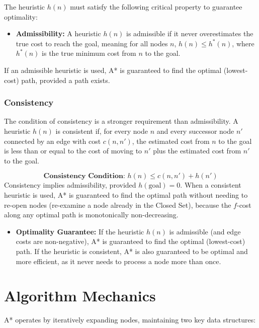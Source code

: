 The heuristic $h(n)$ must satisfy the following critical property to guarantee optimality:

\begin{itemize}
    \item \textbf{Admissibility:} A heuristic $h(n)$ is admissible if it never overestimates the true cost to reach the goal, meaning for all nodes $n$, $h(n) \le h^*(n)$, where $h^*(n)$ is the true minimum cost from $n$ to the goal.
\end{itemize}
If an admissible heuristic is used, A* is guaranteed to find the optimal (lowest-cost) path, provided a path exists.



\subsubsection{Consistency}
The condition of consistency is a stronger requirement than admissibility. A heuristic $h(n)$ is consistent if, for every node $n$ and every successor node $n'$ connected by an edge with cost $c(n, n')$, the estimated cost from $n$ to the goal is less than or equal to the cost of moving to $n'$ plus the estimated cost from $n'$ to the goal.

$$\textbf{Consistency Condition: } h(n) \le c(n, n') + h(n')$$
Consistency implies admissibility, provided $h(\text{goal}) = 0$. When a consistent heuristic is used, A* is guaranteed to find the optimal path without needing to re-open nodes (re-examine a node already in the Closed Set), because the $f$-cost along any optimal path is monotonically non-decreasing.

\begin{itemize}
    \item \textbf{Optimality Guarantee:} If the heuristic $h(n)$ is admissible (and edge costs are non-negative), A* is guaranteed to find the optimal (lowest-cost) path. If the heuristic is consistent, A* is also guaranteed to be optimal and more efficient, as it never needs to process a node more than once.
\end{itemize}


\section{Algorithm Mechanics}
A* operates by iteratively expanding nodes, maintaining two key data structures:

